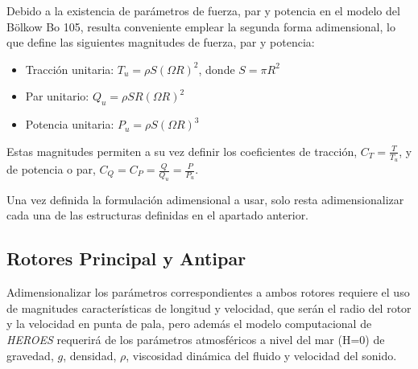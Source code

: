 Debido a la existencia de parámetros de fuerza, par y potencia en el modelo del Bölkow Bo 105, resulta conveniente emplear la segunda forma adimensional, lo que define las siguientes magnitudes de fuerza, par y potencia:

\begin{itemize}
	\item Tracción unitaria: $T_u=\rho S(\Omega R)^2$, donde $S=\pi R^2$
	\item Par unitario: $Q_u=\rho SR(\Omega R)^2$
	\item Potencia unitaria: $P_u=\rho S(\Omega R)^3$
\end{itemize}

Estas magnitudes permiten a su vez definir los coeficientes de tracción, $C_T=\frac{T}{T_u}$, y de potencia o par, $C_Q=C_P=\frac{Q}{Q_u}=\frac{P}{P_u}$.

Una vez definida la formulación adimensional a usar, solo resta adimensionalizar cada una de las estructuras definidas en el apartado anterior.

\subsection{Rotores Principal y Antipar}

Adimensionalizar los parámetros correspondientes a ambos rotores requiere el uso de magnitudes características de longitud y velocidad, que serán el radio del rotor y la velocidad en punta de pala, pero además el modelo computacional de \emph{HEROES} requerirá de los parámetros atmosféricos a nivel del mar (H=0) de gravedad, $g$, densidad, $\rho$, viscosidad dinámica del fluido y velocidad del sonido.

